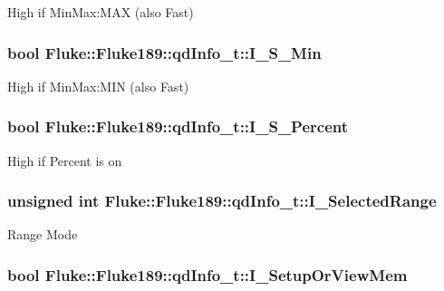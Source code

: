 \label{structFluke_1_1Fluke189_1_1qdInfo__t_ab2c6db915334d26e1ae1e20e555d038f}
High if MinMax:MAX (also Fast) \hypertarget{structFluke_1_1Fluke189_1_1qdInfo__t_a05535e90048e650e455f4e1bcd95ce98}{
\subsubsection[{I\_\-S\_\-Min}]{\setlength{\rightskip}{0pt plus 5cm}bool {\bf Fluke::Fluke189::qdInfo\_\-t::I\_\-S\_\-Min}}}
\label{structFluke_1_1Fluke189_1_1qdInfo__t_a05535e90048e650e455f4e1bcd95ce98}
High if MinMax:MIN (also Fast) \hypertarget{structFluke_1_1Fluke189_1_1qdInfo__t_a7e0cb15be9e813efe89bf94b5bcf3a52}{
\subsubsection[{I\_\-S\_\-Percent}]{\setlength{\rightskip}{0pt plus 5cm}bool {\bf Fluke::Fluke189::qdInfo\_\-t::I\_\-S\_\-Percent}}}
\label{structFluke_1_1Fluke189_1_1qdInfo__t_a7e0cb15be9e813efe89bf94b5bcf3a52}
High if Percent is on \hypertarget{structFluke_1_1Fluke189_1_1qdInfo__t_a6b4b393c0d2a331ec2f029447cebb917}{
\subsubsection[{I\_\-SelectedRange}]{\setlength{\rightskip}{0pt plus 5cm}unsigned int {\bf Fluke::Fluke189::qdInfo\_\-t::I\_\-SelectedRange}}}
\label{structFluke_1_1Fluke189_1_1qdInfo__t_a6b4b393c0d2a331ec2f029447cebb917}
Range Mode \hypertarget{structFluke_1_1Fluke189_1_1qdInfo__t_aa470149681ea3898d86ddb11306eddd8}{
\subsubsection[{I\_\-SetupOrViewMem}]{\setlength{\rightskip}{0pt plus 5cm}bool {\bf Fluke::Fluke189::qdInfo\_\-t::I\_\-SetupOrViewMem}}}
